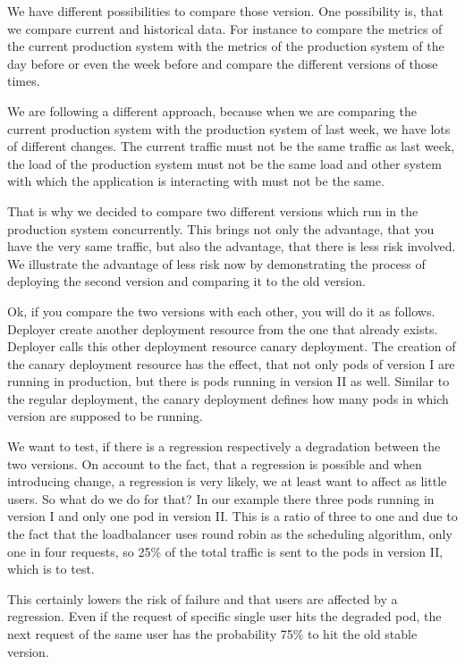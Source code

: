 We have different possibilities to compare those version. One possibility is, that we
compare current and historical data. For instance to compare the metrics of the current
production system with the metrics of the production system of the day before or even the
week before and compare the different versions of those times.

We are following a different approach, because when we are comparing the current
production system with the production system of last week, we have lots of different
changes. The current traffic must not be the same traffic as last week, the load of the
production system must not be the same load and other system with which the application is
interacting with must not be the same.

That is why we decided to compare two different versions which run in the production
system concurrently. This brings not only the advantage, that you have the very same
traffic, but also the advantage, that there is less risk involved. We illustrate the
advantage of less risk now by demonstrating the process of deploying the second version
and comparing it to the old version.

Ok, if you compare the two versions with each other, you will do it as follows. Deployer
create another deployment resource from the one that already exists. Deployer calls this
other deployment resource canary deployment. The creation of the canary deployment
resource has the effect, that not only pods of version I are running in production, but
there is pods running in version II as well. Similar to the regular deployment, the canary
deployment defines how many pods in which version are supposed to be running.

We want to test, if there is a regression respectively a degradation between the two
versions. On account to the fact, that a regression is possible and when introducing
change, a regression is very likely, we at least want to affect as little users. So what
do we do for that? In our example there three pods running in version I and only one pod
in version II. This is a ratio of three to one and due to the fact that the loadbalancer
uses round robin as the scheduling algorithm, only one in four requests, so 25\% of the
total traffic is sent to the pods in version II, which is to test.

This certainly lowers the risk of failure and that users are affected by a
regression. Even if the request of specific single user hits the degraded pod, the next
request of the same user has the probability 75\% to hit the old stable version.

